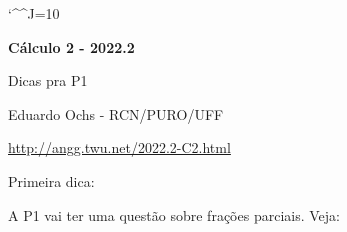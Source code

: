 \documentclass[oneside,12pt]{article}
\begin{document}
\catcode`\^^J=10
\pu
\def\pictgridstyle{\color{GrayPale}\linethickness{0.3pt}}
\def\pictaxesstyle{\linethickness{0.5pt}}
\def\pictnaxesstyle{\color{GrayPale}\linethickness{0.5pt}}
\celllower=2.5pt


\def\u#1{\par{\footnotesize \url{#1}}}

\def\drafturl{http://angg.twu.net/LATEX/2022-2-C2.pdf}
\def\drafturl{http://angg.twu.net/2022.2-C2.html}
\def\draftfooter{\tiny \href{\drafturl}{\jobname{}} \ColorBrown{\shorttoday{} \hours}}



%

\thispagestyle{empty}

\begin{center}

\vspace*{1.2cm}

{\bf \Large Cálculo 2 - 2022.2}

\bsk

Dicas pra P1

\bsk

Eduardo Ochs - RCN/PURO/UFF

\url{http://angg.twu.net/2022.2-C2.html}

\end{center}

\newpage


Primeira dica:

A P1 vai ter uma questão sobre frações parciais. Veja:
\end{document}
